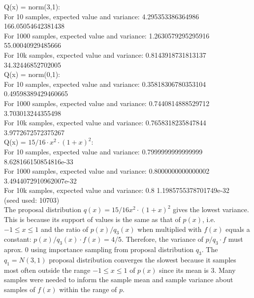 \documentclass[12pt]{article}
\begin{document}
\begin{enumerate}
\begin{tcolorbox}[fit,height=10cm, width=\textwidth, blank, borderline={1pt}{-2pt},nobeforeafter]
    Q(x) = norm(3,1):\\
For 10 samples, expected value and variance: 4.295353386364986 166.05054642381438\\
For 1000 samples, expected value and variance: 1.2630579295295916 55.00040929485666\\
For 10k samples, expected value and variance: 0.8143918731813137 34.32446852702005\\
Q(x) = norm(0,1):\\
For 10 samples, expected value and variance: 0.35818306780353104 0.49598389429460665\\
For 1000 samples, expected value and variance: 0.7440814888529712 3.703013244355498\\
For 10k samples, expected value and variance: 0.7658318235847844 3.9772672572375267\\
Q(x) = $15/16\cdot x^2 \cdot (1+x)^2$:\\
For 10 samples, expected value and variance: 0.7999999999999999 8.628166150854816e-33\\
For 1000 samples, expected value and variance: 0.8000000000000002 3.4944072910962007e-32\\
For 10k samples, expected value and variance: 0.8 1.1985755378701749e-32 \\
(seed used: 10703)\\

The proposal distribution $q(x) = 15/16x^2\cdot (1+x)^2$ gives the lowest variance. This is because its support of values is the same as that of $p(x)$, i.e. $-1 \le x \le 1$ and the ratio of $p(x)/q_3(x)$ when multiplied with $f(x)$ equals a constant: $p(x)/q_3(x) \cdot f(x) = 4/5$. Therefore, the variance of $p/q_3\cdot f$ must aprox. 0 using importance sampling from proposal distribution $q_3$. The $q_1 = N(3,1)$ proposal distribution converges the slowest because it samples most often outside the range $-1 \le x \le 1$  of $p(x)$ since its mean is 3. Many samples were needed to inform the sample mean and sample variance about samples of $f(x)$ within the range of $p$.
    \end{tcolorbox}
    

\end{enumerate}
\end{document}
